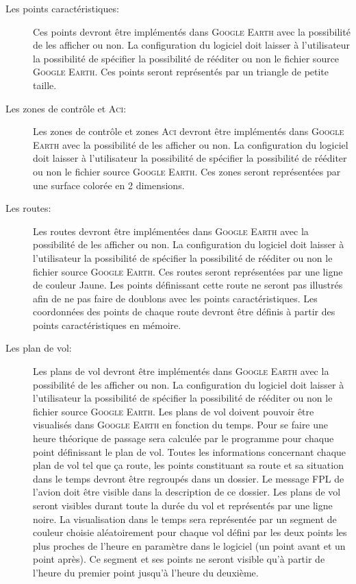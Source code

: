 \begin{description}
    \item[Les points caractéristiques:] Ces points devront être implémentés dans \textsc{Google Earth} avec la possibilité de les afficher ou non. La configuration du logiciel doit laisser à l'utilisateur la possibilité de spécifier la possibilité de rééditer ou non le fichier source \textsc{Google Earth}. Ces points seront représentés par un triangle de petite taille.

    \item[Les zones de contrôle et \textsc{Aci}:] Les zones de contrôle et zones \textsc{Aci} devront être implémentés dans \textsc{Google Earth} avec la possibilité de les afficher ou non. La configuration du logiciel doit laisser à l'utilisateur la possibilité de spécifier la possibilité de rééditer ou non le fichier source \textsc{Google Earth}. Ces zones seront représentées par une surface colorée en 2 dimensions.

    \item[Les routes:] Les routes devront être implémentées dans \textsc{Google Earth} avec la possibilité de les afficher ou non. La configuration du logiciel doit laisser à l'utilisateur la possibilité de spécifier la possibilité de rééditer ou non le fichier source \textsc{Google Earth}. Ces routes seront représentées par une ligne de couleur Jaune. Les points définissant cette route ne seront pas illustrés afin de ne pas faire de doublons avec les points caractéristiques. Les coordonnées des points de chaque route devront être définis à partir des points caractéristiques en mémoire.

    \item[Les plan de vol:] Les plans de vol devront être implémentés dans \textsc{Google Earth} avec la possibilité de les afficher ou non. La configuration du logiciel doit laisser à l'utilisateur la possibilité de spécifier la possibilité de rééditer ou non le fichier source \textsc{Google Earth}. Les plans de vol doivent pouvoir être visualisés dans \textsc{Google Earth} en fonction du temps. Pour se faire une heure théorique de passage sera calculée par le programme pour chaque point définissant le plan de vol. Toutes les informations concernant chaque plan de vol tel que ça route, les points constituant sa route et sa situation dans le temps devront être regroupés dans un dossier. Le message FPL de l'avion doit être visible dans la description de ce dossier. Les plans de vol seront visibles durant toute la durée du vol et représentés par une ligne noire. La visualisation dans le temps sera représentée par un segment de couleur choisie aléatoirement pour chaque vol défini par les deux points les plus proches de l'heure en paramètre dans le logiciel (un point avant et un point après). Ce segment et ses points ne seront visible qu'à partir de l'heure du premier point jusqu'à l'heure du deuxième. 


\end{description}
